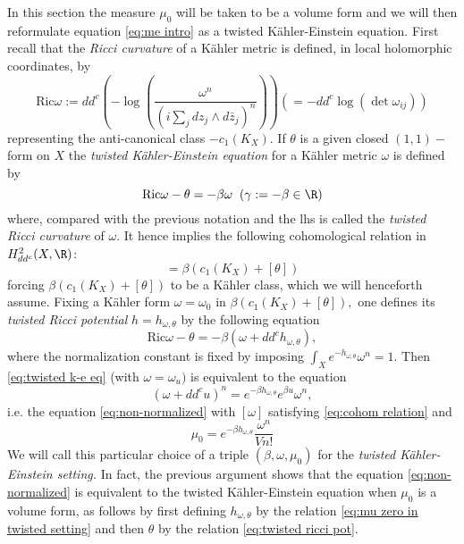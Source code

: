\documentclass[11pt,oneside,english]{amsart}
\numberwithin{equation}{section}
\numberwithin{figure}{section}
\theoremstyle{plain}
\theoremstyle{plain}
\theoremstyle{plain}
\theoremstyle{plain}
\theoremstyle{remark}
\theoremstyle{definition}
\begin{document}
In this section the measure $\mu_{0}$ will be taken to be a volume
form and we will then reformulate equation \ref{eq:me intro} as a
twisted Kähler-Einstein equation. First recall that the\emph{ Ricci
curvature} of a Kähler metric is defined, in local holomorphic coordinates,
by 
\[
\mbox{Ric}\omega:=dd^{c}(-\log(\frac{\omega^{n}}{(i\sum_{j}dz_{j}\wedge d\bar{z}_{j})^{n}}))(=-dd^{c}\log(\det\omega_{ij}))
\]
 representing the anti-canonical class $-c_{1}(K_{X}).$ If $\theta$
is a given closed $(1,1)-$form on $X$ the \emph{twisted Kähler-Einstein
equation} for a Kähler metric $\omega$ is defined by 
\begin{equation}
\mbox{Ric}\omega-\theta=-\beta\omega\,\,\:(\gamma:=-\beta\in\R)\label{eq:twisted k-e eq}
\end{equation}
 where, compared with the previous notation and the lhs is called
the\emph{ twisted Ricci curvature} of $\omega.$ It hence implies
the following cohomological relation in $H_{dd^{c}}^{2}(X,\R)$: 
\begin{equation}
[\omega]=\beta(c_{1}(K_{X})+[\theta])\label{eq:cohom relation}
\end{equation}
 forcing $\beta(c_{1}(K_{X})+[\theta])$ to be a Kähler class, which
we will henceforth assume. Fixing a Kähler form $\omega=\omega_{0}$
in $\beta(c_{1}(K_{X})+[\theta]),$ one defines its \emph{twisted
Ricci potential }$h=h_{\omega,\theta}$ by the following equation
\begin{equation}
\mbox{Ric}\omega-\theta=-\beta(\omega+dd^{c}h_{\omega,\theta}),\label{eq:twisted ricci pot}
\end{equation}
 where the normalization constant is fixed by imposing $\int_{X}e^{-h_{\omega,\theta}}\omega^{n}=1.$
Then \ref{eq:twisted k-e eq} (with $\omega=\omega_{u})$ is equivalent
to the equation 
\begin{equation}
(\omega+dd^{c}u)^{n}=e^{-\beta h_{\omega,\theta}}e^{\beta u}\omega^{n},\label{eq:m-e equation in twisted set}
\end{equation}
 i.e. the  equation \ref{eq:non-normalized} with $[\omega]$ satisfying
\ref{eq:cohom relation} and 
\begin{equation}
\mu_{0}=e^{-\beta h_{\omega,\theta}}\frac{\omega^{n}}{Vn!}\label{eq:mu zero in twisted setting}
\end{equation}
 We will call this particular choice of a triple $(\beta,\omega,\mu_{0})$
for the\emph{ twisted Kähler-Einstein setting. }In fact, the previous
argument shows that the equation \ref{eq:non-normalized} is equivalent
to the twisted Kähler-Einstein equation when $\mu_{0}$ is a volume
form, as follows by first defining $h_{\omega,\theta}$ by the relation
\ref{eq:mu zero in twisted setting} and then $\theta$ by the relation
\ref{eq:twisted ricci pot}.
\end{document}
